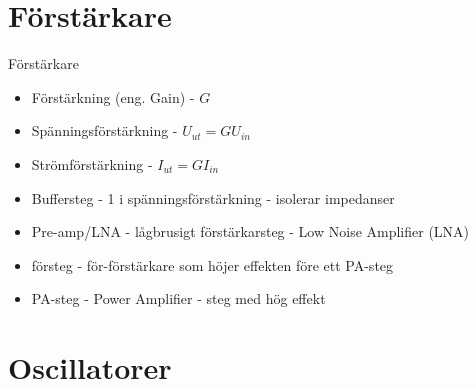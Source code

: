 \documentclass{beamer}
\begin{document}
\section{Förstärkare}

\begin{frame}{Förstärkare}
  \begin{itemize}
  \item Förstärkning (eng. Gain) - $G$
  \item Spänningsförstärkning - $U_{ut} = G U_{in}$
  \item Strömförstärkning - $I_{ut} = G I_{in}$
  \item Buffersteg - 1 i spänningsförstärkning - isolerar impedanser
  \item Pre-amp/LNA - lågbrusigt förstärkarsteg - Low Noise Amplifier (LNA)
  \item försteg - för-förstärkare som höjer effekten före ett PA-steg
  \item PA-steg - Power Amplifier - steg med hög effekt
  \end{itemize}
\end{frame}

\section{Oscillatorer}
\end{document}
